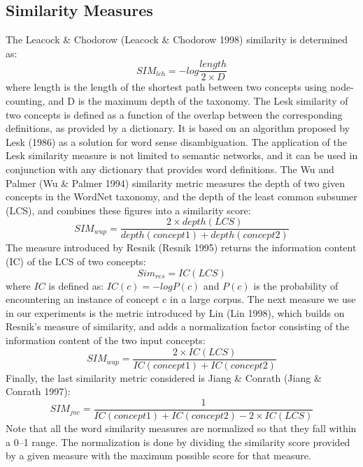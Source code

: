 \subsection{Similarity Measures}
\label {SimilarityMeasures}
\label{measuresSection}
The Leacock \& Chodorow (Leacock \& Chodorow 1998) similarity is determined as:
\begin{equation}
SIM_{lch} = -log \frac{length}{2 \times D}
\end{equation}
where length is the length of the shortest path between two concepts using node-counting, and D is the maximum depth of the taxonomy.
The Lesk similarity of two concepts is defined as a function of the overlap between the corresponding definitions, as provided by a dictionary. It is based on an algorithm proposed by Lesk (1986) as a solution for word sense disambiguation.
The application of the Lesk similarity measure is not limited to semantic networks, and it can be used in conjunction with any dictionary that provides word definitions.
The Wu and Palmer (Wu \& Palmer 1994) similarity metric measures the depth of two given concepts in the WordNet taxonomy, and the depth of the least common subsumer (LCS), and combines these figures into a similarity score:
\begin{equation}
SIM_{wup} =\frac{2\times depth(LCS)}{depth(concept1) + depth(concept2)}
\end{equation}
The measure introduced by Resnik (Resnik 1995) returns the information content (IC) of the LCS of two concepts:
\begin{equation}
Sim_{res} = IC(LCS)
\end{equation}
where $IC$ is defined as:
$IC(c) = -log P(c)$ and $P(c)$ is the probability of encountering an instance of concept c in a large corpus.
The next measure we use in our experiments is the metric introduced by Lin (Lin 1998), which builds on Resnik’s measure of similarity, and adds a normalization factor consisting of the information content of the two input concepts:
\begin{equation}
SIM_{wup} =\frac{2\times IC(LCS)}{IC(concept1) + IC(concept2)}
\end{equation}
Finally, the last similarity metric considered is Jiang \& Conrath (Jiang \& Conrath 1997):
\begin{equation}
SIM_{jnc} =\frac{1}{IC(concept1) + IC(concept2) - 2\times IC(LCS)}
\end{equation}
Note that all the word similarity measures are normalized so that they fall within a 0–1 range. The normalization is done by dividing the similarity score provided by a given measure with the maximum possible score for that measure. 


